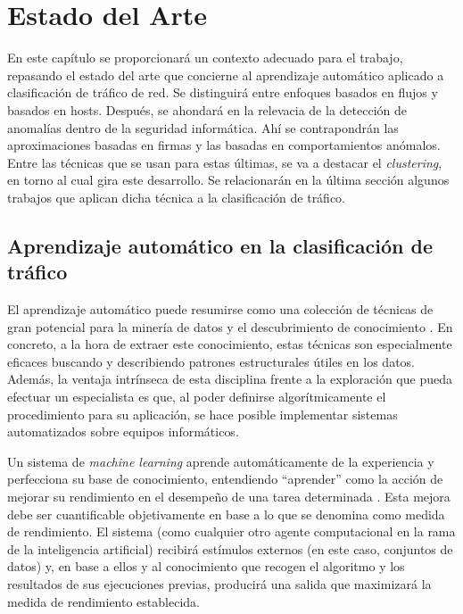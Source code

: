 \chapter{Estado del Arte}\label{chap:estadodelarte}

En este capítulo se proporcionará un contexto adecuado para el trabajo, repasando el estado del arte que concierne al aprendizaje automático aplicado a clasificación de tráfico de red.
Se distinguirá entre enfoques basados en flujos y basados en hosts.
Después, se ahondará en la relevacia de la detección de anomalías dentro de la seguridad informática.
Ahí se contrapondrán las aproximaciones basadas en firmas y las basadas en comportamientos anómalos.
Entre las técnicas que se usan para estas últimas, se va a destacar el \emph{clustering}, en torno al cual gira este desarrollo.
Se relacionarán en la última sección algunos trabajos que aplican dicha técnica a la clasificación de tráfico.

\section{Aprendizaje automático en la clasificación de tráfico}\label{sec:aprendizajeautomaticoenclasiftrafico}

El aprendizaje automático puede resumirse como una colección de técnicas de gran potencial para la minería de datos y el descubrimiento de conocimiento \cite{NA08}.
En concreto, a la hora de extraer este conocimiento, estas técnicas son especialmente eficaces buscando y describiendo patrones estructurales útiles en los datos.
Además, la ventaja intrínseca de esta disciplina frente a la exploración que pueda efectuar un especialista es que, al poder definirse algorítmicamente el procedimiento para su aplicación, se hace posible implementar sistemas automatizados sobre equipos informáticos.

Un sistema de \emph{machine learning} aprende automáticamente de la experiencia y perfecciona su base de conocimiento, entendiendo ``aprender'' como la acción de mejorar su rendimiento en el desempeño de una tarea determinada \cite{Simon_1983}.
Esta mejora debe ser cuantificable objetivamente en base a lo que se denomina como medida de rendimiento.
El sistema (como cualquier otro agente computacional en la rama de la inteligencia artificial) recibirá estímulos externos (en este caso, conjuntos de datos) y,
en base a ellos y al conocimiento que recogen el algoritmo y los resultados de sus ejecuciones previas, producirá una salida que maximizará la medida de rendimiento establecida.

